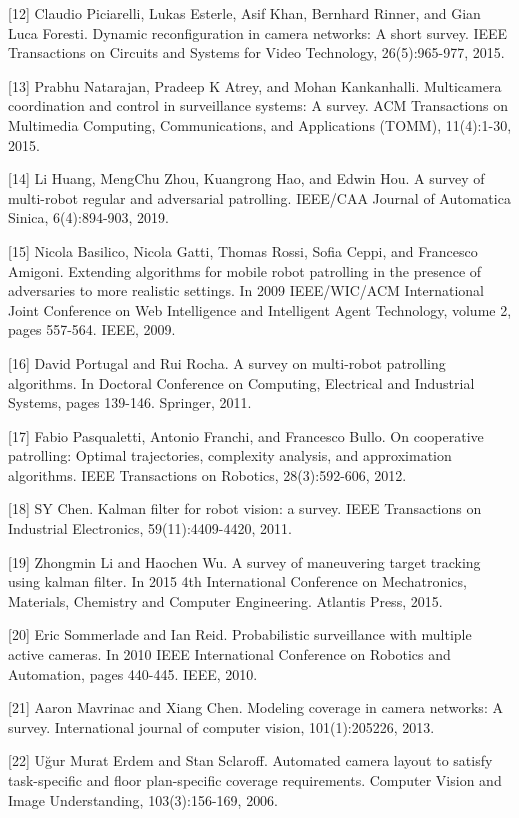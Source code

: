 \documentclass[conference]{IEEEtran}
\begin{document}
[12] Claudio Piciarelli, Lukas Esterle, Asif Khan, Bernhard Rinner, and Gian Luca Foresti. Dynamic reconfiguration in camera networks: A short survey. IEEE Transactions on Circuits and Systems for Video Technology, 26(5):965-977, 2015.

[13] Prabhu Natarajan, Pradeep K Atrey, and Mohan Kankanhalli. Multicamera coordination and control in surveillance systems: A survey. ACM Transactions on Multimedia Computing, Communications, and Applications (TOMM), 11(4):1-30, 2015.

[14] Li Huang, MengChu Zhou, Kuangrong Hao, and Edwin Hou. A survey of multi-robot regular and adversarial patrolling. IEEE/CAA Journal of Automatica Sinica, 6(4):894-903, 2019.

[15] Nicola Basilico, Nicola Gatti, Thomas Rossi, Sofia Ceppi, and Francesco Amigoni. Extending algorithms for mobile robot patrolling in the presence of adversaries to more realistic settings. In 2009 IEEE/WIC/ACM International Joint Conference on Web Intelligence and Intelligent Agent Technology, volume 2, pages 557-564. IEEE, 2009.

[16] David Portugal and Rui Rocha. A survey on multi-robot patrolling algorithms. In Doctoral Conference on Computing, Electrical and Industrial Systems, pages 139-146. Springer, 2011.

[17] Fabio Pasqualetti, Antonio Franchi, and Francesco Bullo. On cooperative patrolling: Optimal trajectories, complexity analysis, and approximation algorithms. IEEE Transactions on Robotics, 28(3):592-606, 2012.

[18] SY Chen. Kalman filter for robot vision: a survey. IEEE Transactions on Industrial Electronics, 59(11):4409-4420, 2011.

[19] Zhongmin Li and Haochen Wu. A survey of maneuvering target tracking using kalman filter. In 2015 4th International Conference on Mechatronics, Materials, Chemistry and Computer Engineering. Atlantis Press, 2015.

[20] Eric Sommerlade and Ian Reid. Probabilistic surveillance with multiple active cameras. In 2010 IEEE International Conference on Robotics and Automation, pages 440-445. IEEE, 2010.

[21] Aaron Mavrinac and Xiang Chen. Modeling coverage in camera networks: A survey. International journal of computer vision, 101(1):205226, 2013.

[22] Uğur Murat Erdem and Stan Sclaroff. Automated camera layout to satisfy task-specific and floor plan-specific coverage requirements. Computer Vision and Image Understanding, 103(3):156-169, 2006.
\end{document}
